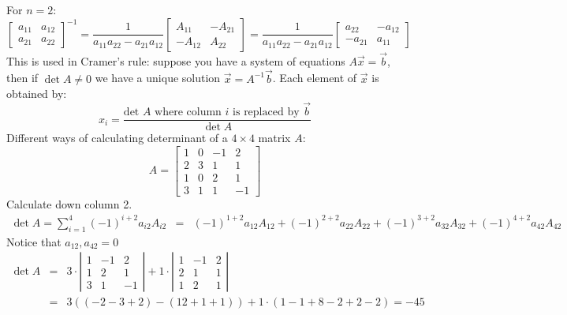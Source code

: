 \documentclass{article}
\newcommand{\nocomma}{}
\begin{document}
For $n = 2$:
\[ \left[\begin{array}{cc}
     a_{11} & a_{12}\\
     a_{21} & a_{22}
   \end{array}\right]^{- 1} = \frac{1}{a_{11} a_{22} - a_{21} a_{12}} 
   \left[\begin{array}{cc}
     A_{11} & - A_{21}\\
     - A_{12} & A_{22}
   \end{array}\right] = \frac{1}{a_{11} a_{22} - a_{21} a_{12}} 
   \left[\begin{array}{cc}
     a_{22} & - a_{12}\\
     - a_{21} & a_{11}
   \end{array}\right] \]
This is used in Cramer's rule: suppose you have a system of equations $A
\vec{x} = \vec{b}$, then if $\det A \neq 0$ we have a unique solution $\vec{x}
= A^{- 1}  \vec{b}$. Each element of $\vec{x}$ is obtained by:
\[ x_i = \frac{\text{det $A$ where column $i$ is replaced by } \vec{b}}{\det
   A} \]
Different ways of calculating determinant of a $4 \times 4$ matrix $A$:
\[ A = \left[\begin{array}{cccc}
     1 & 0 & - 1 & 2\\
     2 & 3 & 1 & 1\\
     1 & 0 & 2 & 1\\
     3 & 1 & 1 & - 1
   \end{array}\right] \]
Calculate down column 2.
\begin{eqnarray*}
  \det A = \sum_{i = 1}^4 (- 1)^{i + 2} a_{i \nocomma 2} A_{i \nocomma 2} & =
  & (- 1)^{1 + 2} a_{12} A_{12} + (- 1)^{2 + 2} a_{22} A_{22} + (- 1)^{3 + 2}
  a_{32} A_{32} + (- 1)^{4 + 2} a_{42} A_{42}
\end{eqnarray*}
Notice that $a_{12}, a_{42} = 0$
\begin{eqnarray*}
  \det A & = & 3 \cdot \left|\begin{array}{ccc}
    1 & - 1 & 2\\
    1 & 2 & 1\\
    3 & 1 & - 1
  \end{array}\right| + 1 \cdot \left|\begin{array}{ccc}
    1 & - 1 & 2\\
    2 & 1 & 1\\
    1 & 2 & 1
  \end{array}\right|\\
  & = & 3 ((- 2 - 3 + 2) - (12 + 1 + 1)) + 1 \cdot (1 - 1 + 8 - 2 + 2 - 2) =
  - 45
\end{eqnarray*}
\end{document}
